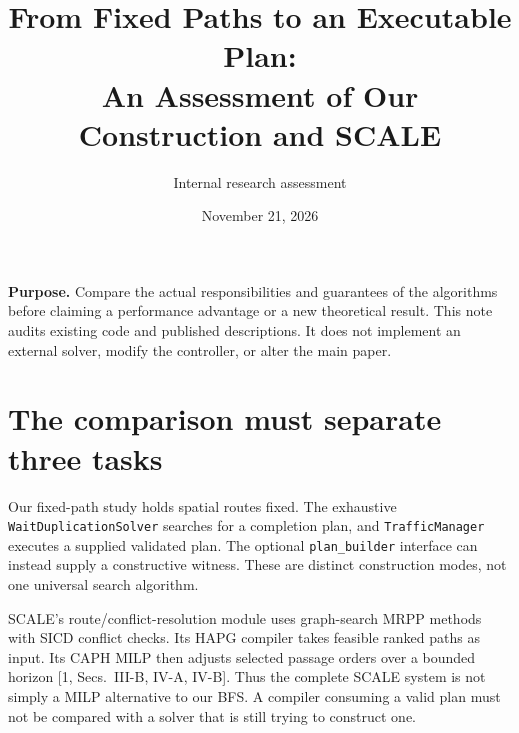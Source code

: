 \documentclass[11pt,a4paper]{article}
\title{From Fixed Paths to an Executable Plan:\\An Assessment of Our Construction and SCALE}
\author{Internal research assessment}
\date{November 21, 2026}
\begin{document}
\maketitle
\noindent\textbf{Purpose.} Compare the actual responsibilities and guarantees of
the algorithms before claiming a performance advantage or a new theoretical
result. This note audits existing code and published descriptions. It does not
implement an external solver, modify the controller, or alter the main paper.

\section{The comparison must separate three tasks}
\begin{center}
\end{center}
Our fixed-path study holds spatial routes fixed. The exhaustive
\texttt{WaitDuplicationSolver} searches for a completion plan, and
\texttt{TrafficManager} executes a supplied validated plan. The optional
\texttt{plan\_builder} interface can instead supply a constructive witness.
These are distinct construction modes, not one universal search algorithm.

SCALE's route/conflict-resolution module uses graph-search MRPP methods with
SICD conflict checks. Its HAPG compiler takes feasible ranked paths as input.
Its CAPH MILP then adjusts selected passage orders over a bounded horizon [1,
Secs.~III-B, IV-A, IV-B]. Thus the complete SCALE system is not simply a MILP
alternative to our BFS. A compiler consuming a valid plan must not be compared
with a solver that is still trying to construct one.
\end{document}

